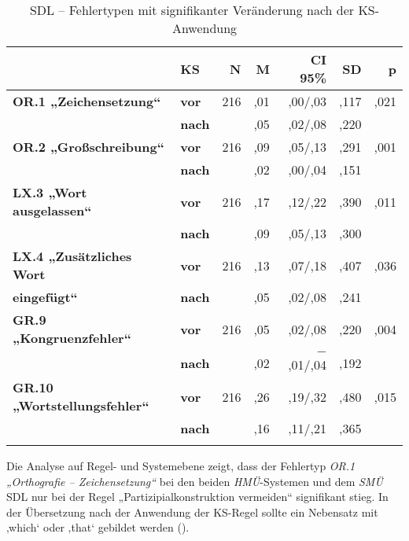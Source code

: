 \begin{table}
\begin{tabularx}{\textwidth}{llrrrrr}

\lsptoprule
& \textbf{KS} & \textbf{N} & \textbf{M} & \textbf{CI 95\%} & \textbf{SD} & \textbf{p}\\
 \midrule
\textbf{OR.1 „Zeichensetzung“} & \textbf{vor} & 216 & ,01 & ,00/,03 & ,117 & ,021\\
& \textbf{nach} & & ,05 & ,02/,08  & ,220 & \\
\tablevspace
\textbf{OR.2 „Großschreibung“} & \textbf{vor} & 216 & ,09 & ,05/,13 & ,291 & ,001\\
& \textbf{nach} & & ,02 & ,00/,04 & ,151 & \\
\tablevspace
\textbf{LX.3 „Wort ausgelassen“}  & \textbf{vor} & 216 & ,17 & ,12/,22 & ,390 & ,011\\
& \textbf{nach} &  & ,09 & ,05/,13 & ,300 & \\
\tablevspace
\textbf{LX.4 „Zusätzliches Wort} & \textbf{vor} & 216 & ,13 & ,07/,18 & ,407 & ,036\\
\textbf{eingefügt“} & \textbf{nach} & & ,05 & ,02/,08 & ,241 &\\
\tablevspace
\textbf{GR.9 „Kongruenzfehler“} & \textbf{vor} & 216 & ,05 & ,02/,08 & ,220 & ,004\\
& \textbf{nach} & & ,02 & $-$ ,01/,04 & ,192 & \\
\tablevspace
\textbf{GR.10 „Wortstellungsfehler“} & \textbf{vor} & 216 & ,26 & ,19/,32  & ,480& ,015\\
& \textbf{nach} & & ,16 & ,11/,21 & ,365 & \\
\lspbottomrule
\end{tabularx}
\caption{\label{tab:05:93}SDL -- Fehlertypen mit signifikanter Veränderung nach der KS-Anwendung  }
\end{table}

Die Analyse auf Regel- und Systemebene zeigt, dass der Fehlertyp \textit{OR.1 „Orthografie -- Zeichensetzung“} bei den beiden \textit{HMÜ}{}-Systemen und dem \textit{SMÜ} SDL nur bei der Regel „Partizipialkonstruktion vermeiden“ signifikant stieg. In der Übersetzung nach der Anwendung der KS-Regel sollte ein Nebensatz mit ‚which‘ oder ‚that‘ gebildet werden ().


